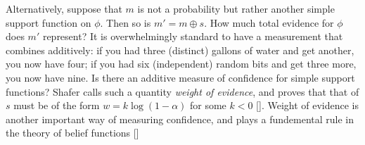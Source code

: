 \begin{example}
Alternatively, suppose that $m$ is not a probability but rather
another simple support function on $\phi$. 
Then so is $m' = m\oplus s$. 
How much total evidence for $\phi$ does $m'$ represent?
It is overwhelmingly standard to have a measurement that combines additively:
if you had three (distinct) gallons of water and get another, you now have four;
if you had six (independent) random bits and get three more, you now have nine. 
Is there an additive measure of confidence 
for simple support functions? 
Shafer calls such a quantity \emph{weight of evidence},
and proves that that of $s$ must be of the form
$w = k \log (1-\alpha)$ for some $k < 0$
[\citeauthor[pg 78]{shafer1976mathematical}]. 
Weight of evidence
is another important way of measuring confidence,
and plays
a fundemental rule in the theory of belief functions 
[\citeauthor[e.g.][Theorem 5.5]{shafer1976mathematical}]
\end{example}

